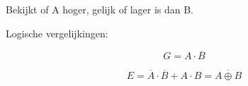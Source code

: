\documentclass[11pt, a4paper]{article}
\begin{document}
Bekijkt of A hoger, gelijk of lager is dan B.

Logische vergelijkingen:

\begin{equation}
	G = A \cdot \overline{B}
\end{equation}

\begin{equation}
	E = \overline{A} \cdot \overline{B} + A \cdot B = \overline{A \oplus B}
\end{equation}

\end{document}
